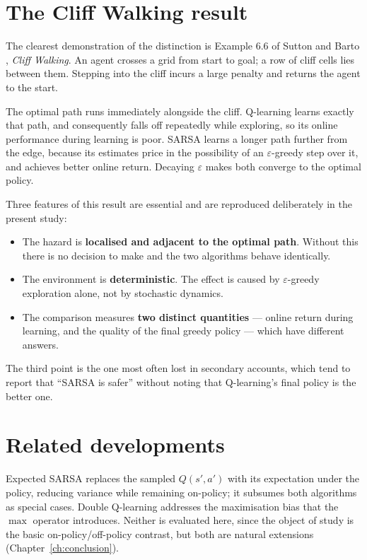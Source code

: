 \section{The Cliff Walking result}

The clearest demonstration of the distinction is Example 6.6 of Sutton and Barto \cite{sutton2018},
\emph{Cliff Walking}. An agent crosses a grid from start to goal; a row of cliff cells lies between
them. Stepping into the cliff incurs a large penalty and returns the agent to the start.

The optimal path runs immediately alongside the cliff. Q-learning learns exactly that path, and
consequently falls off repeatedly while exploring, so its online performance during learning is
poor. SARSA learns a longer path further from the edge, because its estimates price in the
possibility of an $\varepsilon$-greedy step over it, and achieves better online return. Decaying
$\varepsilon$ makes both converge to the optimal policy.

Three features of this result are essential and are reproduced deliberately in the present study:

\begin{itemize}
\item The hazard is \textbf{localised and adjacent to the optimal path}. Without this there is no
      decision to make and the two algorithms behave identically.
\item The environment is \textbf{deterministic}. The effect is caused by $\varepsilon$-greedy
      exploration alone, not by stochastic dynamics.
\item The comparison measures \textbf{two distinct quantities} --- online return during learning,
      and the quality of the final greedy policy --- which have different answers.
\end{itemize}

The third point is the one most often lost in secondary accounts, which tend to report that
``SARSA is safer'' without noting that Q-learning's final policy is the better one.

\section{Related developments}

Expected SARSA \cite{vanseijen2009} replaces the sampled $Q(s',a')$ with its expectation under the
policy, reducing variance while remaining on-policy; it subsumes both algorithms as special cases.
Double Q-learning \cite{hasselt2010} addresses the maximisation bias that the $\max$ operator
introduces. Neither is evaluated here, since the object of study is the basic on-policy/off-policy
contrast, but both are natural extensions (Chapter~\ref{ch:conclusion}).

